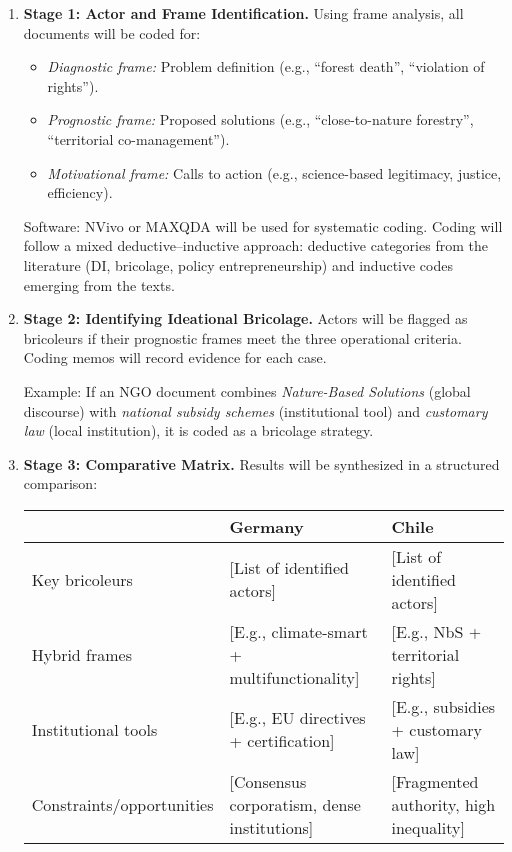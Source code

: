 \begin{enumerate}
    \item \textbf{Stage 1: Actor and Frame Identification.}  
    Using frame analysis, all documents will be coded for:
    \begin{itemize}
        \item \textit{Diagnostic frame:} Problem definition (e.g., ``forest death'', 
        ``violation of rights'').
        \item \textit{Prognostic frame:} Proposed solutions (e.g., 
        ``close-to-nature forestry'', ``territorial co-management'').
        \item \textit{Motivational frame:} Calls to action (e.g., science-based 
        legitimacy, justice, efficiency).
    \end{itemize}
    Software: NVivo or MAXQDA will be used for systematic coding.  
    Coding will follow a mixed deductive–inductive approach: deductive categories 
    from the literature (DI, bricolage, policy entrepreneurship) and inductive 
    codes emerging from the texts.

    \item \textbf{Stage 2: Identifying Ideational Bricolage.}  
    Actors will be flagged as bricoleurs if their prognostic frames meet the three 
    operational criteria. Coding memos will record evidence for each case. 

    Example: If an NGO document combines \textit{Nature-Based Solutions} (global discourse) 
    with \textit{national subsidy schemes} (institutional tool) and \textit{customary law} 
    (local institution), it is coded as a bricolage strategy.

    \item \textbf{Stage 3: Comparative Matrix.}  
    Results will be synthesized in a structured comparison:

    \begin{center}
    \begin{tabular}{p{3cm}p{5cm}p{5cm}}
    \toprule
    & \textbf{Germany} & \textbf{Chile} \\
    \midrule
    Key bricoleurs & [List of identified actors] & [List of identified actors] \\
    Hybrid frames & [E.g., climate-smart + multifunctionality] & [E.g., NbS + territorial rights] \\
    Institutional tools & [E.g., EU directives + certification] & [E.g., subsidies + customary law] \\
    Constraints/opportunities & [Consensus corporatism, dense institutions] & [Fragmented authority, high inequality] \\
    \bottomrule
    \end{tabular}
    \end{center}
\end{enumerate}

